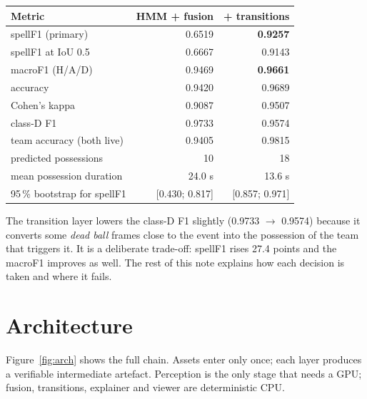 \documentclass[10pt,a4paper]{article}
\begin{document}
\begin{center}
\small
{}
\label{tab:metrics}
\begin{tabular}{lrr}
\toprule
Metric & HMM + fusion & \textbf{+ transitions} \\
\midrule
spellF1 (primary) & 0.6519 & \textbf{0.9257} \\
spellF1 at IoU 0.5 & 0.6667 & 0.9143 \\
macroF1 (H/A/D) & 0.9469 & \textbf{0.9661} \\
accuracy & 0.9420 & 0.9689 \\
Cohen's kappa & 0.9087 & 0.9507 \\
class-D F1 & 0.9733 & 0.9574 \\
team accuracy (both live) & 0.9405 & 0.9815 \\
predicted possessions & 10 & 18 \\
mean possession duration & 24.0 s & 13.6 s \\
95\,\% bootstrap for spellF1 & [0.430; 0.817] & [0.857; 0.971] \\
\bottomrule
\end{tabular}
\end{center}

The transition layer lowers the class-D F1 slightly (0.9733 $\to$ 0.9574) because it converts
some \emph{dead ball} frames close to the event into the possession of the team that triggers
it. It is a deliberate trade-off: spellF1 rises 27.4 points and the macroF1 improves as well.
The rest of this note explains how each decision is taken and where it fails.

\section{Architecture}

Figure~\ref{fig:arch} shows the full chain. Assets enter only once; each layer produces a
verifiable intermediate artefact. Perception is the only stage that needs a GPU; fusion,
transitions, explainer and viewer are deterministic CPU.
\end{document}
